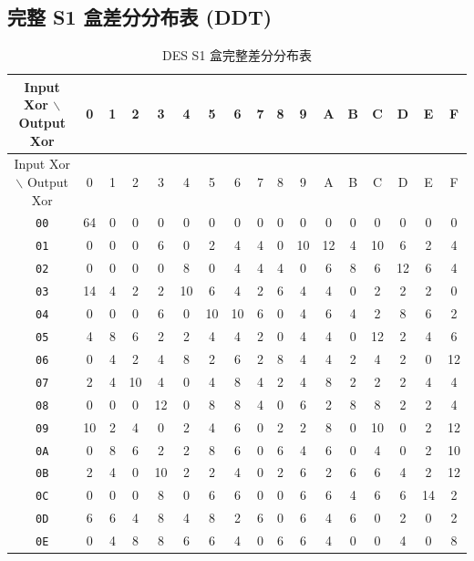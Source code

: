 
\appendix
\subsection{完整 S1 盒差分分布表 (DDT)}
\begin{center}
\begin{small}
\begin{longtable}{c|cccccccccccccccc}
\caption{DES S1 盒完整差分分布表} \\
\toprule
Input Xor $\backslash$ Output Xor & 0 & 1 & 2 & 3 & 4 & 5 & 6 & 7 & 8 & 9 & A & B & C & D & E & F \\ \midrule
\endfirsthead
\toprule
Input Xor $\backslash$ Output Xor  & 0 & 1 & 2 & 3 & 4 & 5 & 6 & 7 & 8 & 9 & A & B & C & D & E & F \\ \midrule
\endhead
\texttt{00} & 64 & 0 & 0 & 0 & 0 & 0 & 0 & 0 & 0 & 0 & 0 & 0 & 0 & 0 & 0 & 0 \\
\texttt{01} & 0 & 0 & 0 & 6 & 0 & 2 & 4 & 4 & 0 & 10 & 12 & 4 & 10 & 6 & 2 & 4 \\
\texttt{02} & 0 & 0 & 0 & 0 & 8 & 0 & 4 & 4 & 4 & 0 & 6 & 8 & 6 & 12 & 6 & 4 \\
\texttt{03} & 14 & 4 & 2 & 2 & 10 & 6 & 4 & 2 & 6 & 4 & 4 & 0 & 2 & 2 & 2 & 0 \\
\texttt{04} & 0 & 0 & 0 & 6 & 0 & 10 & 10 & 6 & 0 & 4 & 6 & 4 & 2 & 8 & 6 & 2 \\
\texttt{05} & 4 & 8 & 6 & 2 & 2 & 4 & 4 & 2 & 0 & 4 & 4 & 0 & 12 & 2 & 4 & 6 \\
\texttt{06} & 0 & 4 & 2 & 4 & 8 & 2 & 6 & 2 & 8 & 4 & 4 & 2 & 4 & 2 & 0 & 12 \\
\texttt{07} & 2 & 4 & 10 & 4 & 0 & 4 & 8 & 4 & 2 & 4 & 8 & 2 & 2 & 2 & 4 & 4 \\
\texttt{08} & 0 & 0 & 0 & 12 & 0 & 8 & 8 & 4 & 0 & 6 & 2 & 8 & 8 & 2 & 2 & 4 \\
\texttt{09} & 10 & 2 & 4 & 0 & 2 & 4 & 6 & 0 & 2 & 2 & 8 & 0 & 10 & 0 & 2 & 12 \\
\texttt{0A} & 0 & 8 & 6 & 2 & 2 & 8 & 6 & 0 & 6 & 4 & 6 & 0 & 4 & 0 & 2 & 10 \\
\texttt{0B} & 2 & 4 & 0 & 10 & 2 & 2 & 4 & 0 & 2 & 6 & 2 & 6 & 6 & 4 & 2 & 12 \\
\texttt{0C} & 0 & 0 & 0 & 8 & 0 & 6 & 6 & 0 & 0 & 6 & 6 & 4 & 6 & 6 & 14 & 2 \\
\texttt{0D} & 6 & 6 & 4 & 8 & 4 & 8 & 2 & 6 & 0 & 6 & 4 & 6 & 0 & 2 & 0 & 2 \\
\texttt{0E} & 0 & 4 & 8 & 8 & 6 & 6 & 4 & 0 & 6 & 6 & 4 & 0 & 0 & 4 & 0 & 8 \\

\end{longtable}
\end{small}
\end{center}
